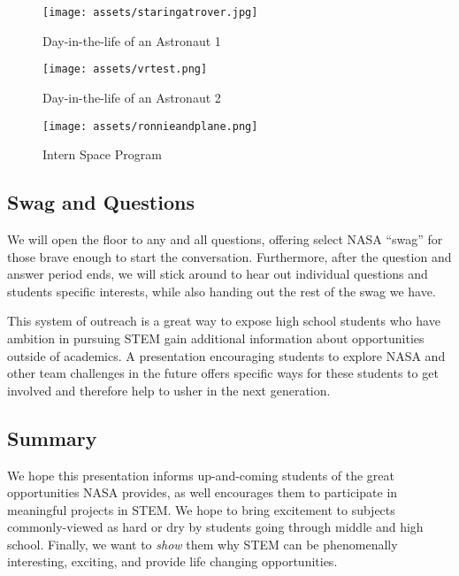 \documentclass{article}
\let\Oldsubsection\subsection
\renewcommand{\subsection}{\FloatBarrier\Oldsubsection}
\begin{document}
\begin{figure}[!htb]
  \centering
  \texttt{[image: assets/staringatrover.jpg]}
  \caption{Day-in-the-life of an Astronaut 1}
  \label{fig:staringatrover}
\end{figure}

\begin{figure}[!htb]
  \centering
  \texttt{[image: assets/vrtest.png]}
  \caption{Day-in-the-life of an Astronaut 2}
  \label{fig:vrtest}
\end{figure}

\begin{figure}[!htb]
  \centering
  \texttt{[image: assets/ronnieandplane.png]}
  \caption{Intern Space Program}
  \label{fig:ronnieandplane}
\end{figure}

\subsection{Swag and Questions}

We will open the floor to any and all questions, offering select NASA “swag” for those brave enough to start the conversation. Furthermore, after the question and answer period ends, we will stick around to hear out individual questions and students specific interests, while also handing out the rest of the swag we have. 

This system of outreach is a great way to expose high school students who have ambition in pursuing STEM gain additional information about opportunities outside of academics. A presentation encouraging students to explore NASA and other team challenges in the future offers specific ways for these students to get involved and therefore help to usher in the next generation.

\subsection{Summary}

We hope this presentation informs up-and-coming students of the great opportunities NASA provides, as well encourages them to participate in meaningful projects in STEM. We hope to bring excitement to subjects commonly-viewed as hard or dry by students going through middle and high school. Finally, we want to \textit{show} them why STEM can be phenomenally interesting, exciting, and provide life changing opportunities.
\end{document}
